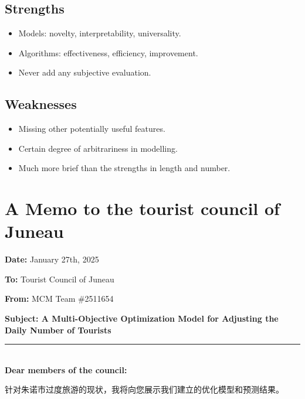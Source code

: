 \documentclass[12pt]{article}  %
\begin{document}
 \subsection{Strengths}
 
 \begin{itemize}
     \setlength{\parsep}{0ex} %
     \setlength{\topsep}{2ex} %
     \setlength{\itemsep}{1ex} %
     \item Models: novelty, interpretability,  universality.
     \item Algorithms: effectiveness, efficiency, improvement.	
     \item Never add any subjective evaluation.
 \end{itemize}
 
 \subsection{Weaknesses}
 
 \begin{itemize}
     \setlength{\parsep}{0ex} %
     \setlength{\topsep}{2ex} %
     \setlength{\itemsep}{1ex} %
     \item Missing other potentially useful features. 
     \item Certain degree of arbitrariness in modelling.	
     \item Much more brief than the strengths in length and number.
 \end{itemize}
 
 
 
 \clearpage
 \section{A Memo to the tourist council of Juneau}
 \noindent
 \textbf{Date:} January 27th, 2025

 \noindent
 \textbf{To:} Tourist Council of Juneau

 \noindent
 \textbf{From:} MCM Team \#2511654

 \noindent
 \textbf{Subject: A Multi-Objective Optimization Model for Adjusting the Daily Number of Tourists}
 

 {\noindent}	 \rule[-0pt]{16.5cm}{0.15em}\\
\noindent
\textbf{Dear members of the council:}

针对朱诺市过度旅游的现状，我将向您展示我们建立的优化模型和预测结果。
\end{document}
